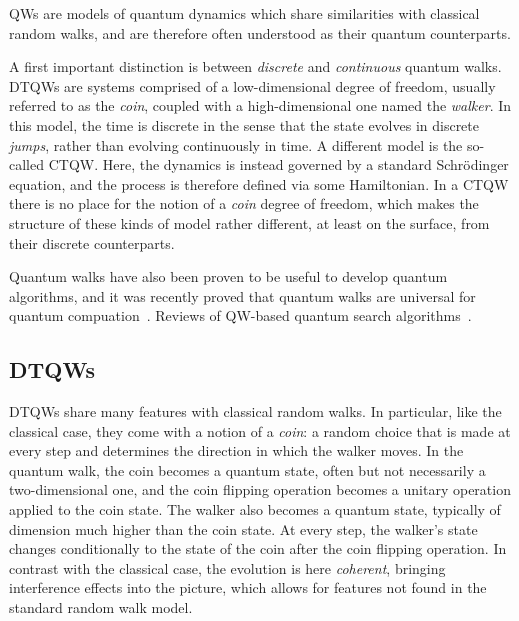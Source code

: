 \acp{QW} are models of quantum dynamics which share similarities with classical random walks, and are therefore often understood as their quantum counterparts.

A first important distinction is between \textit{discrete} and \textit{continuous} quantum walks.
\acp{DTQW} are systems comprised of a low-dimensional degree of freedom, usually referred to as the \textit{coin}, coupled with a high-dimensional one named the \textit{walker}.
In this model, the time is discrete in the sense that the state evolves in discrete \textit{jumps}, rather than evolving continuously in time.
A different model is the so-called \ac{CTQW}. Here, the dynamics is instead governed by a standard Schr\"odinger equation, and the process is therefore defined via some Hamiltonian. In a \ac{CTQW} there is no place for the notion of a \textit{coin} degree of freedom, which makes the structure of these kinds of model rather different, at least on the surface, from their discrete counterparts.

Quantum walks have also been proven to be useful to develop quantum algorithms, and it was recently proved that quantum walks are universal for quantum compuation~\cite{childs2009universal,childs2003exponential,lovett2010universal,lovett2018quantum,underwood2010universal}.
Reviews of QW-based quantum search algorithms~\cite{ambainis2011search,ambainis2008quantum,ambainis2010developments,kempe2003quantum,kendon2006random,santha2008quantum,venegas-andraca2012quantum,Venegas-Andraca2008quantum}.

\subsection{DTQWs}

\acp{DTQW} share many features with classical random walks.
In particular, like the classical case, they come with a notion of a \textit{coin}: a random choice that is made at every step and determines the direction in which the walker moves.
In the quantum walk, the coin becomes a quantum state, often but not necessarily a two-dimensional one, and the coin flipping operation becomes a unitary operation applied to the coin state.
The walker also becomes a quantum state, typically of dimension much higher than the coin state. At every step, the walker's state changes conditionally to the state of the coin after the coin flipping operation.
In contrast with the classical case, the evolution is here \textit{coherent}, bringing interference effects into the picture, which allows for features not found in the standard random walk model.

